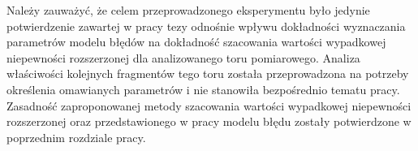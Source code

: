 Należy zauważyć, że celem przeprowadzonego eksperymentu było jedynie potwierdzenie zawartej w pracy tezy odnośnie wpływu dokładności wyznaczania parametrów modelu błędów na dokładność szacowania wartości wypadkowej niepewności rozszerzonej dla analizowanego toru pomiarowego. Analiza właściwości kolejnych fragmentów tego toru została przeprowadzona na potrzeby określenia omawianych parametrów i nie stanowiła bezpośrednio tematu pracy. Zasadność zaproponowanej metody szacowania wartości wypadkowej niepewności rozszerzonej oraz przedstawionego w pracy modelu błędu zostały potwierdzone w poprzednim rozdziale pracy.
